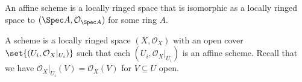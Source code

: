 An affine scheme is a locally ringed space that is isomorphic as a locally
ringed space to $(\Spec A, \mathcal{O}_{\Spec A})$ for some ring $A$.

A scheme is a locally ringed space $(X, \mathcal{O}_X)$ with an open cover
$\set{(U_i, \mathcal{O}_X|_{U_i})}$ such that each $(U_i, \mathcal{O}_X|_{U_i})$
is an affine scheme.  Recall that we have $\mathcal{O}_X|_{U_i}(V) = \mathcal{O}_X(V)$
for $V \subseteq U$ open.
